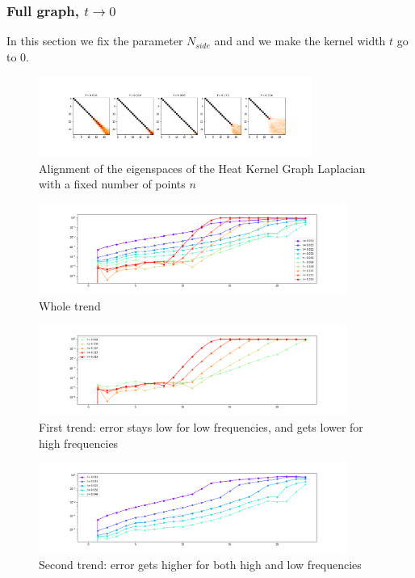 \subsubsection{Full graph, $t\to 0$}
In this section we fix the parameter $N_{side}$ and and we make the kernel width $t$ go to $0$. 
\begin{figure}[h]
	\centering
	\includegraphics[width=0.8\textwidth]{../codes/02.HeatKernelGraphLaplacian/HEALPix/06_figures/t_sensitivity}
	\caption{\label{fig:t_sensitivity_eigenspaces}Alignment of the eigenspaces of the Heat Kernel Graph Laplacian with a fixed number of points $n$}
\end{figure}
\begin{figure}
	\centering
	\includegraphics[width=0.9\textwidth]{../codes/02.HeatKernelGraphLaplacian/HEALPix/06_figures/t_sensitivity_diagonal.png}
	\caption{\label{fig:t_sensitivity_diagonal}Whole trend}
\end{figure}%
\begin{figure}
	\centering
	\includegraphics[width=0.9\textwidth]{../codes/02.HeatKernelGraphLaplacian/HEALPix/06_figures/t_sensitivity_diagonal_2.png}
	\caption{\label{fig:t_sensitivity_diagonal_2}First trend: error stays low for low frequencies, and gets lower for high frequencies}
	\vspace{0.5cm}
\end{figure}
\begin{figure}
	\centering
	\includegraphics[width=0.9\textwidth]{../codes/02.HeatKernelGraphLaplacian/HEALPix/06_figures/t_sensitivity_diagonal_1.png}
	\caption{\label{fig:t_sensitivity_diagonal_1}Second trend: error gets higher for both high and low frequencies}
\end{figure}%
